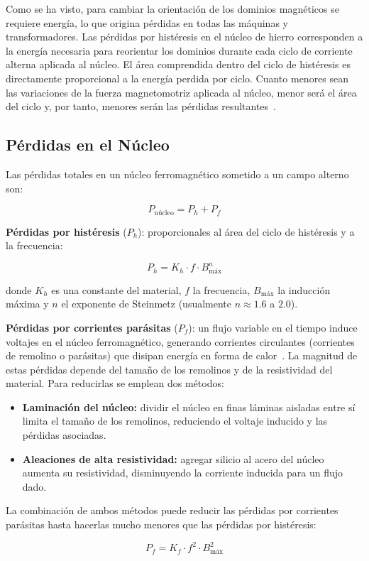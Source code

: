 Como se ha visto, para cambiar la orientación de los dominios magnéticos se requiere energía, lo que origina pérdidas en todas las máquinas y transformadores. Las pérdidas por histéresis en el núcleo de hierro corresponden a la energía necesaria para reorientar los dominios durante cada ciclo de corriente alterna aplicada al núcleo. El área comprendida dentro del ciclo de histéresis es directamente proporcional a la energía perdida por ciclo. Cuanto menores sean las variaciones de la fuerza magnetomotriz aplicada al núcleo, menor será el área del ciclo y, por tanto, menores serán las pérdidas resultantes~\cite{chapman}.

\subsection{Pérdidas en el Núcleo}
Las pérdidas totales en un núcleo ferromagnético sometido a un campo alterno son:

\begin{equation}
    P_{\text{núcleo}} = P_h + P_f
\end{equation}

\textbf{Pérdidas por histéresis} ($P_h$): proporcionales al área del ciclo de histéresis y a la frecuencia:

\begin{equation}
    P_h = K_h \cdot f \cdot B_{\text{máx}}^n
\end{equation}

donde $K_h$ es una constante del material, $f$ la frecuencia, $B_{\text{máx}}$ la inducción máxima y $n$ el exponente de Steinmetz (usualmente $n \approx 1.6$ a $2.0$).

\textbf{Pérdidas por corrientes parásitas} ($P_f$): un flujo variable en el tiempo induce voltajes en el núcleo ferromagnético, generando corrientes circulantes (corrientes de remolino o parásitas) que disipan energía en forma de calor~\cite{chapman}. La magnitud de estas pérdidas depende del tamaño de los remolinos y de la resistividad del material. Para reducirlas se emplean dos métodos:

\begin{itemize}
    \item \textbf{Laminación del núcleo:} dividir el núcleo en finas láminas aisladas entre sí limita el tamaño de los remolinos, reduciendo el voltaje inducido y las pérdidas asociadas.
    \item \textbf{Aleaciones de alta resistividad:} agregar silicio al acero del núcleo aumenta su resistividad, disminuyendo la corriente inducida para un flujo dado.
\end{itemize}

La combinación de ambos métodos puede reducir las pérdidas por corrientes parásitas hasta hacerlas mucho menores que las pérdidas por histéresis:

\begin{equation}
    P_f = K_f \cdot f^2 \cdot B_{\text{máx}}^2
\end{equation}
